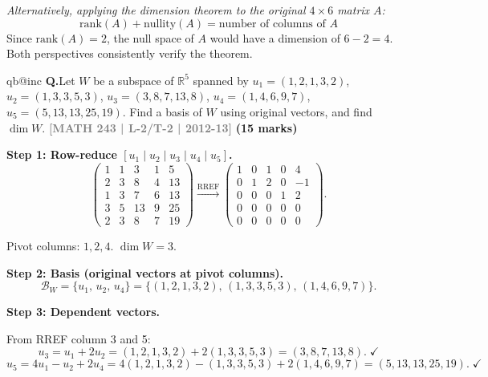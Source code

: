 \documentclass[12pt,a3paper]{article}
\makeatletter
\newcommand{\yr}[1]{\hfill\textcolor{gray}{\small\textbf{[#1]}}}
\newcommand{\mk}[1]{\textcolor{orange!70!black}{\small\textbf{(#1 marks)}}}
\newcounter{qnum}
\newcommand{\Q}[1]{%
  \csname qb@inc\endcsname
  \needspace{4\baselineskip}
  \refstepcounter{qnum}
  \vspace{6pt}
  \noindent\textbf{Q\theqnum.}\enspace #1\par
}
\makeatother
\begin{document}
\begin{tcolorbox}
\textit{Alternatively, applying the dimension theorem to the original $4 \times 6$ matrix $A$:}
\[
  \mathrm{rank}(A) + \mathrm{nullity}(A) = \text{number of columns of } A
\]
Since $\mathrm{rank}(A) = 2$, the null space of $A$ would have a dimension of $6 - 2 = 4$. Both perspectives consistently verify the theorem.

\end{tcolorbox}

\Q{Let $W$ be a subspace of $\mathbb{R}^5$ spanned by $u_1 = (1,2,1,3,2)$, $u_2 = (1,3,3,5,3)$, $u_3 = (3,8,7,13,8)$, $u_4 = (1,4,6,9,7)$, $u_5 = (5,13,13,25,19)$. Find a basis of $W$ using original vectors, and find $\dim W$.
\yr{MATH 243 | L-2/T-2 | 2012-13} \mk{15}}

\begin{tcolorbox}[enhanced,breakable,
  colback=cC!4,colframe=cC,boxrule=0.8pt,arc=5pt,
  title={\textbf{Answer --- Basis and Dimension of $W = \mathrm{span}\{u_1,\dots,u_5\}$}},
  fonttitle=\bfseries\color{white},colbacktitle=cC]

\textbf{Step 1: Row-reduce $[u_1\mid u_2\mid u_3\mid u_4\mid u_5]$.}
\[
\begin{pmatrix}
1 & 1 &  3 & 1 &  5 \\
2 & 3 &  8 & 4 & 13 \\
1 & 3 &  7 & 6 & 13 \\
3 & 5 & 13 & 9 & 25 \\
2 & 3 &  8 & 7 & 19
\end{pmatrix}
\xrightarrow{\text{RREF}}
\begin{pmatrix}
1 & 0 & 1 & 0 &  4 \\
0 & 1 & 2 & 0 & -1 \\
0 & 0 & 0 & 1 &  2 \\
0 & 0 & 0 & 0 &  0 \\
0 & 0 & 0 & 0 &  0
\end{pmatrix}.
\]

Pivot columns: $1, 2, 4$. \quad $\dim W = 3$.

\medskip
\textbf{Step 2: Basis (original vectors at pivot columns).}
\[
\boxed{\mathcal{B}_W = \{u_1,\, u_2,\, u_4\} = \{(1,2,1,3,2),\,(1,3,3,5,3),\,(1,4,6,9,7)\}}.
\]

\textbf{Step 3: Dependent vectors.}

From RREF column 3 and 5:
\[
u_3 = u_1 + 2u_2 = (1,2,1,3,2)+2(1,3,3,5,3) = (3,8,7,13,8).\;\checkmark
\]
\[
u_5 = 4u_1 - u_2 + 2u_4 = 4(1,2,1,3,2)-(1,3,3,5,3)+2(1,4,6,9,7) = (5,13,13,25,19).\;\checkmark
\]

\end{tcolorbox}
\end{document}
